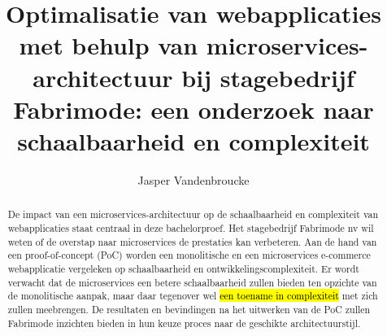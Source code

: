 \documentclass{hogent-article}
\title{Optimalisatie van webapplicaties met behulp van microservices-architectuur bij stagebedrijf Fabrimode: een onderzoek naar schaalbaarheid en complexiteit}
\author{Jasper Vandenbroucke}
\begin{document}
\begin{abstract}
  De impact van een microservices-architectuur op de schaalbaarheid en complexiteit van webapplicaties staat centraal in deze bachelorproef. Het stagebedrijf Fabrimode nv wil weten of de overstap naar microservices de prestaties kan verbeteren. Aan de hand van een proof-of-concept (PoC) worden een monolitische en een microservices e-commerce webapplicatie vergeleken op schaalbaarheid en ontwikkelingscomplexiteit. Er wordt verwacht dat de microservices een betere schaalbaarheid zullen bieden ten opzichte van de monolitische aanpak, maar daar tegenover wel \hl{een toename in complexiteit} met zich zullen meebrengen. De resultaten en bevindingen na het uitwerken van de PoC zullen Fabrimode inzichten bieden in hun keuze proces naar de geschikte architectuurstijl.
\end{abstract}

\tableofcontents



\printbibliography[heading=bibintoc]
\end{document}
